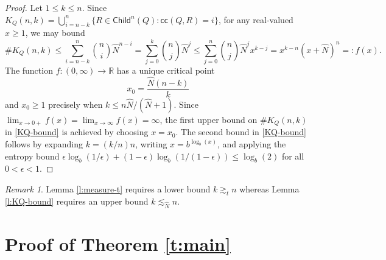 \documentclass[12pt]{amsart}
\theoremstyle{definition}
\theoremstyle{remark}
\newtheorem{remark}[theorem]{Remark}
\newcommand{\RR}{\mathbb{R}}
\newcommand{\Child}{\mathsf{Child}}
\numberwithin{figure}{section}
\numberwithin{equation}{section}
\begin{document}
\begin{proof} Let $1\leq k\leq n$. Since $K_Q(n,k)=\bigcup_{i=n-k}^{n} \{R\in\Child^n(Q):\mathsf{cc}(Q,R)=i\}$, for any real-valued $x\geq 1$, we may bound $$\#K_Q(n,k) \leq \sum_{i=n-k}^n\binom{n}{i} \hat N^{n-i}=\sum_{j=0}^k \binom{n}{j}\hat N^j\leq \sum_{j=0}^n \binom{n}{j} \hat N^j x^{k-j}=x^{k-n}(x+\hat N)^n=:f(x).$$ The function $f:(0,\infty)\rightarrow\RR$ has a unique critical point \begin{equation*}x_0=\frac{\hat N(n-k)}{k}\end{equation*} and $x_0\geq 1$ precisely when $k \leq n\hat N/(\hat N+1)$. Since $\lim_{x\rightarrow 0+} f(x)=\lim_{x\rightarrow\infty} f(x)=\infty$, the first upper bound on $\#K_Q(n,k)$ in \eqref{KQ-bound} is achieved by choosing $x=x_0$. The second bound in \eqref{KQ-bound} follows by expanding $k=(k/n)n$, writing $x=b^{\log_b(x)}$, and applying the entropy bound $\epsilon\log_b(1/\epsilon)+(1-\epsilon)\log_b(1/(1-\epsilon))\leq \log_b(2)$ for all $0<\epsilon<1$.
\end{proof}

\begin{remark}Lemma \ref{l:measure-t} requires a lower bound $k\gtrsim_t n$ whereas Lemma \ref{l:KQ-bound} requires an upper bound $k\lesssim_{\hat N} n$.\end{remark}

\section{Proof of Theorem \ref{t:main}}\label{s:rect}
\end{document}
